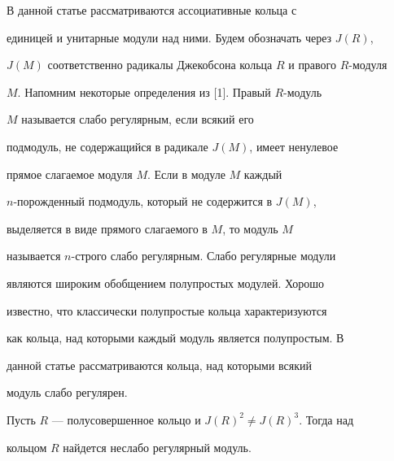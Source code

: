  


В данной статье рассматриваются ассоциативные кольца с 


единицей и унитарные модули над ними. Будем обозначать через $J(R)$, 


$J(M)$ соответственно радикалы Джекобсона кольца $R$ и правого $R$-модуля 


$M$. Напомним некоторые определения из [1]. Правый $R$-модуль 


$M$ называется слабо регулярным, если всякий его 


подмодуль, не содержащийся в радикале $J(M)$, имеет ненулевое 


прямое слагаемое модуля $M$. Если в модуле $M$ каждый 


$n$-порожденный подмодуль, который не содержится в $J(M)$, 


выделяется в виде прямого слагаемого в $M$, то модуль $M$ 


называется $n$-строго слабо регулярным. Слабо регулярные модули 


являются широким обобщением полупростых модулей. Хорошо 


известно, что классически полупростые кольца характеризуются 


как кольца, над которыми каждый модуль является полупростым. В 


данной статье рассматриваются кольца, над которыми всякий 


модуль слабо регулярен. 


 


\begin{thm} 


Пусть $R$ --- полусовершенное кольцо и $J(R)^2\ne J(R)^3$. Тогда над 


кольцом $R$ найдется неслабо регулярный модуль. 


\end{thm} 


 


